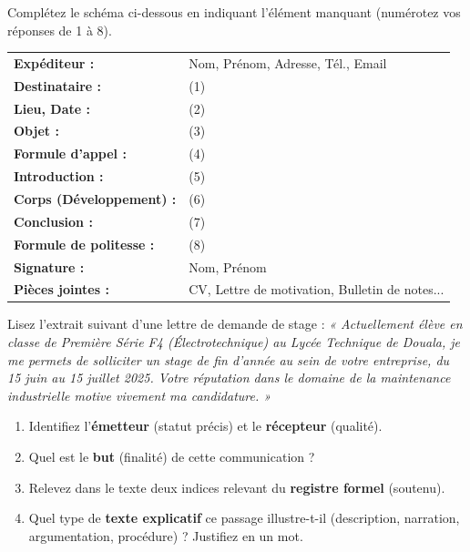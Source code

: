 \documentclass[11pt]{article}
\begin{document}
\begin{exercice}
Complétez le schéma ci-dessous en indiquant l'élément manquant (numérotez vos réponses de 1 à 8).

\begin{tabular}{ll}
\textbf{Expéditeur :} & Nom, Prénom, Adresse, Tél., Email \\
\textbf{Destinataire :} & \underline{\hspace{5cm}} (1) \\
\textbf{Lieu, Date :} & \underline{\hspace{5cm}} (2) \\
\textbf{Objet :} & \underline{\hspace{5cm}} (3) \\
\textbf{Formule d'appel :} & \underline{\hspace{5cm}} (4) \\
\textbf{Introduction :} & \underline{\hspace{5cm}} (5) \\
\textbf{Corps (Développement) :} & \underline{\hspace{5cm}} (6) \\
\textbf{Conclusion :} & \underline{\hspace{5cm}} (7) \\
\textbf{Formule de politesse :} & \underline{\hspace{5cm}} (8) \\
\textbf{Signature :} & Nom, Prénom \\
\textbf{Pièces jointes :} & CV, Lettre de motivation, Bulletin de notes...
\end{tabular}
\end{exercice}

\begin{exercice}
Lisez l'extrait suivant d'une lettre de demande de stage :
\vspace{0.5em}
\noindent\textit{« Actuellement élève en classe de Première Série F4 (Électrotechnique) au Lycée Technique de Douala, je me permets de solliciter un stage de fin d'année au sein de votre entreprise, du 15 juin au 15 juillet 2025. Votre réputation dans le domaine de la maintenance industrielle motive vivement ma candidature. »}
\vspace{0.5em}
\begin{enumerate}
    \item Identifiez l'\textbf{émetteur} (statut précis) et le \textbf{récepteur} (qualité).
    \item Quel est le \textbf{but} (finalité) de cette communication ?
    \item Relevez dans le texte deux indices relevant du \textbf{registre formel} (soutenu).
    \item Quel type de \textbf{texte explicatif} ce passage illustre-t-il (description, narration, argumentation, procédure) ? Justifiez en un mot.
\end{enumerate}
\end{exercice}
\end{document}
